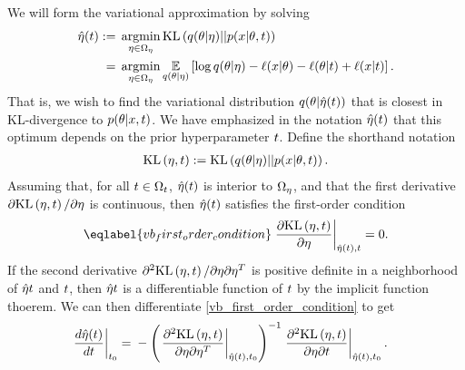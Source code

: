 We will form the variational approximation by solving
%
\begin{align*}
%
\etaopt(\t) :={}&
    \argmin_{\eta \in \etadom} \KL{\q(\theta \vert \eta) || p(\x \vert \theta, \t)} \\
={}& \argmin_{\eta \in \etadom}
        \expect{\q(\theta \vert \eta)}{
        \log \q(\theta \vert \eta) - \logp(\x \vert \theta) -
        \logp(\theta \vert \t) + \logp(\x \vert \t)}.
%
\end{align*}
%
That is, we wish to find the variational distribution $q(\theta \vert
\hat\eta(t))$ that is closest in KL-divergence to $p(\theta \vert x, t)$.  We
have emphasized in the notation $\hat\eta(t)$ that this optimum depends on the
prior hyperparameter $t$.  Define the shorthand notation
%
\begin{align*}
%
\KL{\eta, \t} := \KL{\q(\theta \vert \eta) || p(\x \vert \theta, \t)}.
%
\end{align*}
%
Assuming that, for all $t \in \Omega_{t}$, $\hat\eta(t)$ is interior to $\Omega_{\eta}$,
and that the first derivative $\partial \mathrm{KL}\left(\eta, t\right)/ \partial \eta$ is
continuous, then $\hat\eta(t)$ satisfies the first-order condition
%
\begin{align}\eqlabel{vb_first_order_condition}
%
\fracat{\partial \KL{\eta, \t}}{ \partial \eta}{\etaopt(\t), \t} = 0.
%
\end{align}
%
If the second derivative
$\partial^2 \mathrm{KL}\left(\eta, t\right)/ \partial \eta \partial \eta^T$ is
positive definite in a neighborhood of $\hat\eta{t}$ and $t$,
then $\hat\eta{t}$ is a differentiable function of $t$ by the
implicit function thoerem.  We can then differentiate
\eqref{vb_first_order_condition} to get
%
\begin{align*}
%
\fracat{d \etaopt(\t)}{d \t}{\t_0} ={}&
    - \left( \fracat{\partial^2 \KL{\eta, \t}}
                    {\partial \eta \partial \eta^T}
                    {\etaopt(\t), \t_0} \right)^{-1}
    \fracat{\partial^2 \KL{\eta, \t}}
           {\partial \eta \partial \t}
           {\etaopt(\t), \t_0}.
%
\end{align*}
%


%
